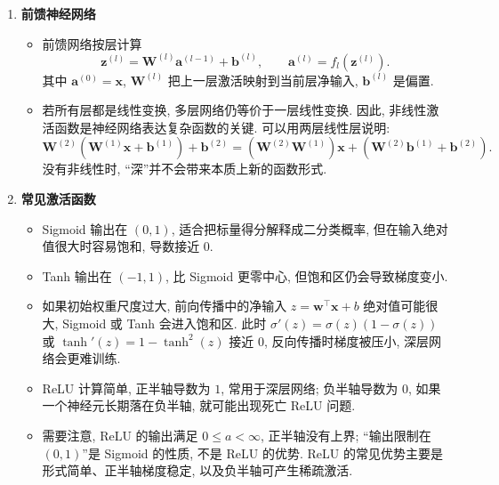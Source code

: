 \documentclass{../nndlcourse}
\begin{document}
\begin{enumerate}
    \item \textbf{前馈神经网络}
    \begin{itemize}
        \item 前馈网络按层计算
        \[
            \boldsymbol{z}^{(l)}
            =
            \boldsymbol{W}^{(l)}\boldsymbol{a}^{(l-1)}
            +
            \boldsymbol{b}^{(l)},
            \qquad
            \boldsymbol{a}^{(l)}
            =
            f_l\left(\boldsymbol{z}^{(l)}\right).
        \]
        其中 $\boldsymbol{a}^{(0)}=\boldsymbol{x}$, $\boldsymbol{W}^{(l)}$ 把上一层激活映射到当前层净输入, $\boldsymbol{b}^{(l)}$ 是偏置.
        \item 若所有层都是线性变换, 多层网络仍等价于一层线性变换. 因此, 非线性激活函数是神经网络表达复杂函数的关键. 可以用两层线性层说明:
        \[
            \boldsymbol{W}^{(2)}
            \left(
                \boldsymbol{W}^{(1)}\boldsymbol{x}
                +
                \boldsymbol{b}^{(1)}
            \right)
            +
            \boldsymbol{b}^{(2)}
            =
            \left(\boldsymbol{W}^{(2)}\boldsymbol{W}^{(1)}\right)\boldsymbol{x}
            +
            \left(\boldsymbol{W}^{(2)}\boldsymbol{b}^{(1)}+\boldsymbol{b}^{(2)}\right).
        \]
        没有非线性时, “深”并不会带来本质上新的函数形式.
    \end{itemize}

    \item \textbf{常见激活函数}
    \begin{itemize}
        \item Sigmoid 输出在 $(0,1)$, 适合把标量得分解释成二分类概率, 但在输入绝对值很大时容易饱和, 导数接近 $0$.
        \item Tanh 输出在 $(-1,1)$, 比 Sigmoid 更零中心, 但饱和区仍会导致梯度变小.
        \item 如果初始权重尺度过大, 前向传播中的净输入 $z=\boldsymbol{w}^{\top}\boldsymbol{x}+b$ 绝对值可能很大, Sigmoid 或 Tanh 会进入饱和区. 此时 $\sigma'(z)=\sigma(z)(1-\sigma(z))$ 或 $\tanh'(z)=1-\tanh^2(z)$ 接近 $0$, 反向传播时梯度被压小, 深层网络会更难训练.
        \item ReLU 计算简单, 正半轴导数为 $1$, 常用于深层网络; 负半轴导数为 $0$, 如果一个神经元长期落在负半轴, 就可能出现死亡 ReLU 问题.
        \item 需要注意, ReLU 的输出满足 $0\le a<\infty$, 正半轴没有上界; “输出限制在 $(0,1)$”是 Sigmoid 的性质, 不是 ReLU 的优势. ReLU 的常见优势主要是形式简单、正半轴梯度稳定, 以及负半轴可产生稀疏激活.
    \end{itemize}


\end{enumerate}
\end{document}
